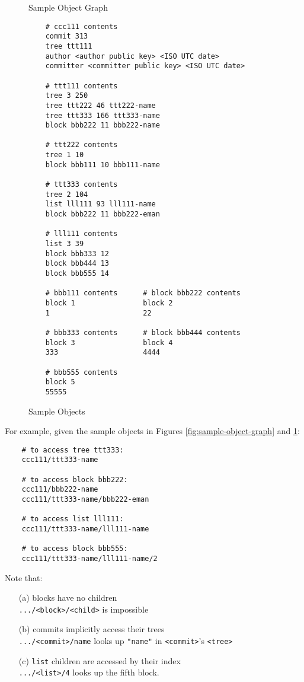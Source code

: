 \documentclass{sig-alternate}
\begin{document}
\begin{figure}
\begin{tikzpicture}[->,>=stealth',auto,thick,
  minimum height=2em,minimum width=5em]
\end{tikzpicture}
\caption{Sample Object Graph} \label{fig:sample-object-graph}

\begin{verbatim}
    # ccc111 contents
    commit 313
    tree ttt111
    author <author public key> <ISO UTC date>
    committer <committer public key> <ISO UTC date>

    # ttt111 contents
    tree 3 250
    tree ttt222 46 ttt222-name
    tree ttt333 166 ttt333-name
    block bbb222 11 bbb222-name

    # ttt222 contents
    tree 1 10
    block bbb111 10 bbb111-name

    # ttt333 contents
    tree 2 104
    list lll111 93 lll111-name
    block bbb222 11 bbb222-eman

    # lll111 contents
    list 3 39
    block bbb333 12
    block bbb444 13
    block bbb555 14

    # bbb111 contents      # block bbb222 contents
    block 1                block 2
    1                      22

    # bbb333 contents      # block bbb444 contents
    block 3                block 4
    333                    4444

    # bbb555 contents
    block 5
    55555
\end{verbatim}
\caption{Sample Objects} \label{fig:sample-objects}
\end{figure}

For example, given the sample objects in Figures \ref{fig:sample-object-graph} and \ref{fig:sample-objects}:

\begin{verbatim}
    # to access tree ttt333:
    ccc111/ttt333-name

    # to access block bbb222:
    ccc111/bbb222-name
    ccc111/ttt333-name/bbb222-eman

    # to access list lll111:
    ccc111/ttt333-name/lll111-name

    # to access block bbb555:
    ccc111/ttt333-name/lll111-name/2
\end{verbatim}

Note that:
\begin{itemize}
  \item[(a)] blocks have no children \\
             \texttt{.../<block>/<child>} is impossible
  \item[(b)] commits implicitly access their trees \\
             \texttt{.../<commit>/name}
             looks up \texttt{"name"} in \texttt{<commit>}'s \texttt{<tree>}
  \item[(c)] \texttt{list} children are accessed by their index \\
             \texttt{.../<list>/4} looks up the fifth block.
\end{itemize}
\end{document}
